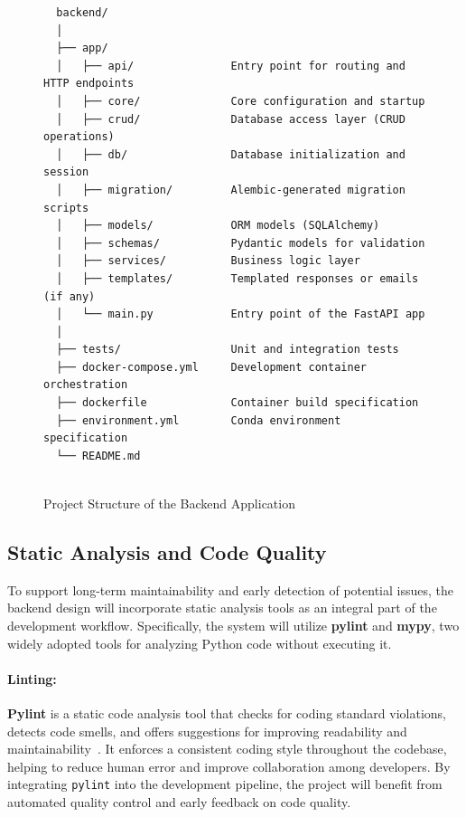 \begin{figure}[t]
  \centering
\begin{verbatim}
  backend/
  │
  ├── app/
  │   ├── api/               Entry point for routing and HTTP endpoints
  │   ├── core/              Core configuration and startup
  │   ├── crud/              Database access layer (CRUD operations)
  │   ├── db/                Database initialization and session
  │   ├── migration/         Alembic-generated migration scripts
  │   ├── models/            ORM models (SQLAlchemy)
  │   ├── schemas/           Pydantic models for validation
  │   ├── services/          Business logic layer
  │   ├── templates/         Templated responses or emails (if any)
  │   └── main.py            Entry point of the FastAPI app
  │
  ├── tests/                 Unit and integration tests
  ├── docker-compose.yml     Development container orchestration
  ├── dockerfile             Container build specification
  ├── environment.yml        Conda environment specification
  └── README.md
  
\end{verbatim}
\caption{Project Structure of the Backend Application}
\label{fig:backend-structure}
\end{figure}

\subsection{Static Analysis and Code Quality}

To support long-term maintainability and early detection of potential issues, the backend design will incorporate static analysis tools as an integral part of the development workflow. Specifically, the system will utilize \textbf{pylint} and \textbf{mypy}, two widely adopted tools for analyzing Python code without executing it.

\paragraph{Linting:}
\textbf{Pylint} is a static code analysis tool that checks for coding standard violations, detects code smells, and offers suggestions for improving readability and maintainability~\cite{pylint}. It enforces a consistent coding style throughout the codebase, helping to reduce human error and improve collaboration among developers. By integrating \texttt{pylint} into the development pipeline, the project will benefit from automated quality control and early feedback on code quality.

